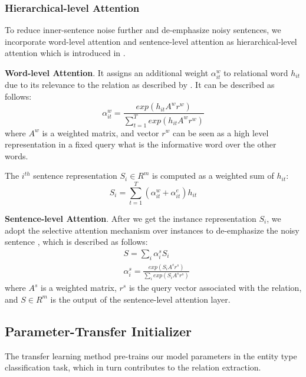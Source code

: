 \documentclass[11pt,a4paper]{article}
\begin{document}
  \subsubsection*{Hierarchical-level Attention}
  To reduce inner-sentence noise further and de-emphasize noisy sentences, we incorporate word-level attention and sentence-level attention as hierarchical-level attention which is introduced in \citet{yang2016hierarchical}.
  
  \textbf{Word-level Attention}. It assigns an additional weight $\alpha_{it}^w$ to relational word $h_{it}$ due to its relevance to the relation as described by \citet{zhou2016attention}. It can be described as follows:
  \begin{equation}
    \alpha_{it}^w=\frac{exp(h_{it}A^wr^w)}{\sum_{t=1}^Texp(h_{it}A^wr^w)}
  \end{equation}
  where $A^w$ is a weighted matrix, and vector $r^w$ can be seen as a high level representation in a fixed query what is the informative word over the other words.
   
  The $i^{th}$ sentence representation $S_i\in R^m$ is computed as a weighted sum of $h_{it}$:
  \begin{equation}
    S_i=\sum_{t=1}^T(\alpha_{it}^w+\alpha_{it}^e)h_{it}  
  \end{equation}

  \textbf{Sentence-level Attention}. After we get the instance representation $S_i$, we adopt the selective attention mechanism over instances to de-emphasize the noisy sentence \citep{lin2016neural}, which is described as follows:
  \begin{align}
    &S=\sum_i\alpha_i^sS_i \label{con:sen_att}\\
    &\alpha_i^s=\frac{exp(S_iA^sr^s)}{\sum_iexp(S_iA^sr^s)}
  \end{align}
  where $A^s$ is a weighted matrix, $r^s$ is the query vector associated with the relation, and $S \in R^m$ is the output of the sentence-level attention layer.

  \subsection{Parameter-Transfer Initializer}
  The transfer learning method pre-trains our model parameters in the entity type classification task, which in turn contributes to the relation extraction.
\end{document}
